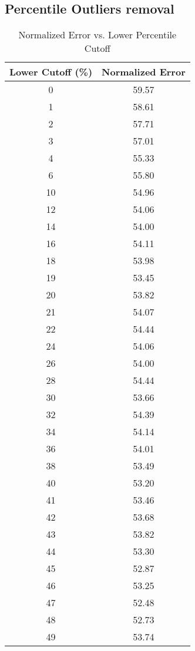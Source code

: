 \subsection*{Percentile Outliers removal}


\begin{table}[H]
\centering
\begin{tabular}{|c|c|}
\hline
\textbf{Lower Cutoff (\%)} & \textbf{Normalized Error} \\ \hline
0  & 59.57 \\ \hline
1  & 58.61 \\ \hline
2  & 57.71 \\ \hline
3  & 57.01 \\ \hline
4  & 55.33 \\ \hline
6  & 55.80 \\ \hline
10 & 54.96 \\ \hline
12 & 54.06 \\ \hline
14 & 54.00 \\ \hline
16 & 54.11 \\ \hline
18 & 53.98 \\ \hline
19 & 53.45 \\ \hline
20 & 53.82 \\ \hline
21 & 54.07 \\ \hline
22 & 54.44 \\ \hline
24 & 54.06 \\ \hline
26 & 54.00 \\ \hline
28 & 54.44 \\ \hline
30 & 53.66 \\ \hline
32 & 54.39 \\ \hline
34 & 54.14 \\ \hline
36 & 54.01 \\ \hline
38 & 53.49 \\ \hline
40 & 53.20 \\ \hline
41 & 53.46 \\ \hline
42 & 53.68 \\ \hline
43 & 53.82 \\ \hline
44 & 53.30 \\ \hline
45 & 52.87 \\ \hline
46 & 53.25 \\ \hline
47 & 52.48 \\ \hline
48 & 52.73 \\ \hline
49 & 53.74 \\ \hline
\end{tabular}
\caption{Normalized Error vs. Lower Percentile Cutoff}
\label{tab:normalized_error}
\end{table}


